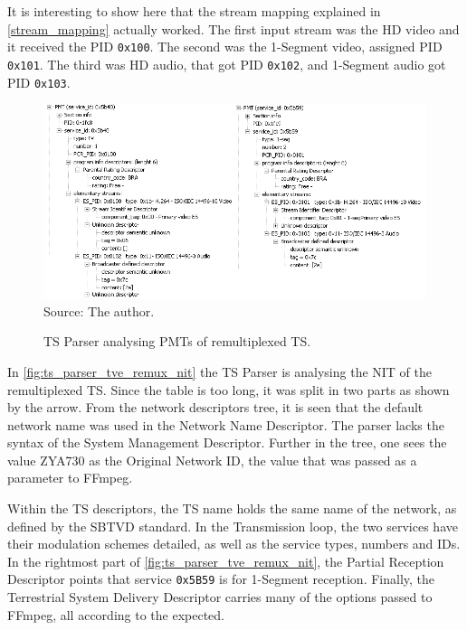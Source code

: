 \documentclass[
	12pt,				%
	openright,			%
	twoside,			%
	a4paper,			%
	brazil,
	french,				%
	english
	]{abntex2}
\begin{document}
It is interesting to show here that the stream mapping explained in \autoref{stream_mapping} actually worked. The first input stream was the HD video and it received the PID \texttt{0x100}. The second was the 1-Segment video, assigned PID \texttt{0x101}. The third was HD audio, that got PID \texttt{0x102}, and 1-Segment audio got PID \texttt{0x103}.

\begin{figure}[!h]
\centering
\caption{TS Parser analysing PMTs of remultiplexed TS.}
\includegraphics[width=0.9\linewidth]{figuras/ts_parser_tve_remux_pmt.png}
\\Source: The author.
\label{fig:ts_parser_tve_remux_pmt}
\end{figure}

In \autoref{fig:ts_parser_tve_remux_nit} the TS Parser is analysing the NIT of the remultiplexed TS. Since the table is too long, it was split in two parts as shown by the arrow. From the network descriptors tree, it is seen that the default network name was used in the Network Name Descriptor. The parser lacks the syntax of the System Management Descriptor. Further in the tree, one sees the value ZYA730 as the Original Network ID, the value that was passed as a parameter to FFmpeg.

Within the TS descriptors, the TS name holds the same name of the network, as defined by the SBTVD standard. In the Transmission loop, the two services have their modulation schemes detailed, as well as the service types, numbers and IDs. In the rightmost part of \autoref{fig:ts_parser_tve_remux_nit}, the Partial Reception Descriptor points that service \texttt{0x5B59} is for 1-Segment reception. Finally, the Terrestrial System Delivery Descriptor carries many of the options passed to FFmpeg, all according to the expected.
\end{document}

